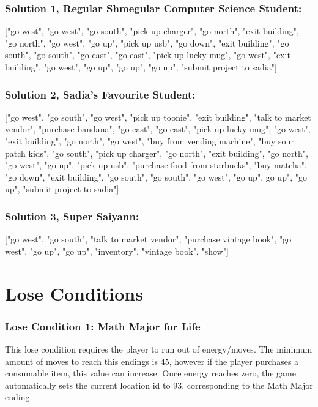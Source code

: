 \documentclass[11pt]{article}
\begin{document}
\noindent
\subsubsection*{Solution 1, Regular Shmegular Computer Science Student:}
["go west", "go west", "go south", "pick up charger", "go north", "exit building", "go north", "go west", "go up", "pick up usb", "go down", "exit building", "go south", "go south", "go east", "go east", "pick up lucky mug", "go west", "exit building", "go west", "go up", "go up", "go up", "submit project to sadia"]

\subsubsection*{Solution 2, Sadia's Favourite Student:}
["go west", "go south", "go west", "pick up toonie", "exit building", "talk to market vendor", "purchase bandana", "go east", "go east", "pick up lucky mug", "go west", "exit building", "go north", "go west", "buy from vending machine", "buy sour patch kids", "go south", "pick up charger", "go north", "exit building", "go north", "go west", "go up", "pick up usb", "purchase food from starbucks", "buy matcha", "go down", "exit building", "go south", "go south", "go west", "go up", go up", "go up", "submit project to sadia"]

\subsubsection*{Solution 3, Super Saiyann:}
["go west", "go south", "talk to market vendor", "purchase vintage book", "go west", "go up", "go up", "inventory", "vintage book", "show"]

\section*{Lose Conditions}
\subsubsection*{Lose Condition 1: Math Major for Life}
This lose condition requires the player to run out of energy/moves. The minimum amount of moves to reach this endings is 45, however if the player purchases a consumable item, this value can increase. Once energy reaches zero, the game automatically sets the current location id to 93, corresponding to the Math Major ending. \vspace{\baselineskip}
\end{document}
